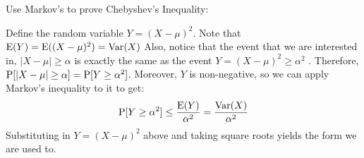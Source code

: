 \question Use Markov's to prove Chebyshev's Inequality:
\begin{solution}[5cm]
Define the random variable $Y = (X - \mu)^2$. Note that $\E(Y) =\E( 
(X - \mu)^2) = \var(X)$
Also, notice that the event that we are interested in, $|X - \mu| \geq 
\alpha $ is exactly the same as the event $Y = (X - \mu)^2 \geq \alpha ^2$ .
Therefore, $\P[|X -\mu| \geq \alpha] = \P[Y \geq \alpha^2 ]$. Moreover, 
$Y$ is non-negative, so we can apply Markov's inequality to it to get:
\[\P[Y \geq \alpha^2] \leq \frac{\E(Y)}{\alpha^2} = \frac{\var(X)}{\alpha^2}\]
Substituting in $Y = (X-\mu)^2$ above and taking square roots yields the form we are used to.
\end{solution}